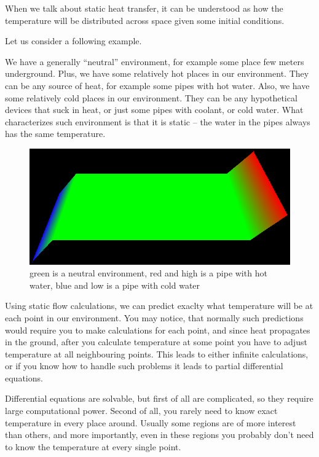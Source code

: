 \documentclass[a4paper,12pt]{article}
\begin{document}
When we talk about static heat transfer, it can be understood as how the temperature will be distributed across space
given some initial conditions. \cite{wiki_heat_transfer}

\newpage

Let us consider a following example.

We have a generally ``neutral'' environment, for example some place few meters underground. Plus, we have some
relatively hot places in our environment. They can be any source of heat, for example some pipes with hot water. Also,
we have some relatively cold places in our environment. They can be any hypothetical devices that suck in heat, or just
some pipes with coolant, or cold water. What characterizes such environment is that it is static -- the water in the
pipes always has the same temperature.

\begin{figure}[H]
\begin{center}
  \includegraphics[width=\textwidth]{heat_before}
\end{center}
\caption{green is a neutral environment, red and high is a pipe with hot water, blue and low is a pipe with cold water}
\end{figure}

Using static flow calculations, we can predict exaclty what temperature will be at each point in our environment. You
may notice, that normally such predictions would require you to make calculations for each point, and since heat
propagates in the ground, after you calculate temperature at some point you have to adjust temperature at all
neighbouring points. This leads to either infinite calculations, or if you know how to handle such problems it leads to
partial differential equations.

Differential equations are solvable, but first of all are complicated, so they require large computational power. Second
of all, you rarely need to know exact temperature in every place around. Usually some regions are of more interest than
others, and more importantly, even in these regions you probably don't need to know the temperature at every single
point.
\end{document}
